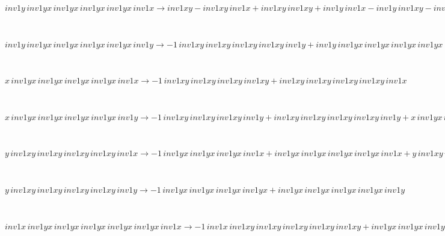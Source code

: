 \documentclass[rep10,leqno]{report}
\begin{document}
\begin{minipage}{6in}
$
inv1y\,
 inv1yx\,
 inv1yx\,
 inv1yx\,
 inv1yx\,
 inv1x\rightarrow inv1xy - inv1xy\,
 inv1x + inv1xy\,
 inv1xy + inv1y\,
 inv1x - inv1y\,
 inv1xy - inv1xy\,
 inv1xy\,
 inv1x + inv1xy\,
 inv1xy\,
 inv1xy + inv1y\,
 inv1xy\,
 inv1x - inv1y\,
 inv1xy\,
 inv1xy - inv1xy\,
 inv1xy\,
 inv1xy\,
 inv1x + inv1xy\,
 inv1xy\,
 inv1xy\,
 inv1xy + inv1y\,
 inv1xy\,
 inv1xy\,
 inv1x - inv1y\,
 inv1xy\,
 inv1xy\,
 inv1xy - inv1xy\,
 inv1xy\,
 inv1xy\,
 inv1xy\,
 inv1x + inv1y\,
 inv1xy\,
 inv1xy\,
 inv1xy\,
 inv1x - inv1y\,
 inv1xy\,
 inv1xy\,
 inv1xy\,
 inv1xy + inv1y\,
 inv1xy\,
 inv1xy\,
 inv1xy\,
 inv1xy\,
 inv1x
$
\end{minipage}\medskip \\
\begin{minipage}{6in}
$
inv1y\,
 inv1yx\,
 inv1yx\,
 inv1yx\,
 inv1yx\,
 inv1y\rightarrow -1\,
 inv1xy\,
 inv1xy\,
 inv1xy\,
 inv1xy\,
 inv1y + inv1y\,
 inv1yx\,
 inv1yx\,
 inv1yx\,
 inv1yx + inv1y\,
 inv1xy\,
 inv1xy\,
 inv1xy\,
 inv1xy\,
 inv1y
$
\end{minipage}\medskip \\
\begin{minipage}{6in}
$
x\,
 inv1yx\,
 inv1yx\,
 inv1yx\,
 inv1yx\,
 inv1x\rightarrow -1\,
 inv1xy\,
 inv1xy\,
 inv1xy\,
 inv1xy + inv1xy\,
 inv1xy\,
 inv1xy\,
 inv1xy\,
 inv1x
$
\end{minipage}\medskip \\
\begin{minipage}{6in}
$
x\,
 inv1yx\,
 inv1yx\,
 inv1yx\,
 inv1yx\,
 inv1y\rightarrow -1\,
 inv1xy\,
 inv1xy\,
 inv1xy\,
 inv1y + inv1xy\,
 inv1xy\,
 inv1xy\,
 inv1xy\,
 inv1y + x\,
 inv1yx\,
 inv1yx\,
 inv1yx\,
 inv1yx
$
\end{minipage}\medskip \\
\begin{minipage}{6in}
$
y\,
 inv1xy\,
 inv1xy\,
 inv1xy\,
 inv1xy\,
 inv1x\rightarrow -1\,
 inv1yx\,
 inv1yx\,
 inv1yx\,
 inv1x + inv1yx\,
 inv1yx\,
 inv1yx\,
 inv1yx\,
 inv1x + y\,
 inv1xy\,
 inv1xy\,
 inv1xy\,
 inv1xy
$
\end{minipage}\medskip \\
\begin{minipage}{6in}
$
y\,
 inv1xy\,
 inv1xy\,
 inv1xy\,
 inv1xy\,
 inv1y\rightarrow -1\,
 inv1yx\,
 inv1yx\,
 inv1yx\,
 inv1yx + inv1yx\,
 inv1yx\,
 inv1yx\,
 inv1yx\,
 inv1y
$
\end{minipage}\medskip \\
\begin{minipage}{6in}
$
inv1x\,
 inv1yx\,
 inv1yx\,
 inv1yx\,
 inv1yx\,
 inv1yx\,
 inv1x\rightarrow -1\,
 inv1x\,
 inv1xy\,
 inv1xy\,
 inv1xy\,
 inv1xy\,
 inv1xy + inv1yx\,
 inv1yx\,
 inv1yx\,
 inv1yx\,
 inv1yx\,
 inv1x + inv1x\,
 inv1xy\,
 inv1xy\,
 inv1xy\,
 inv1xy\,
 inv1xy\,
 inv1x
$
\end{minipage}\medskip \\
\end{document}
